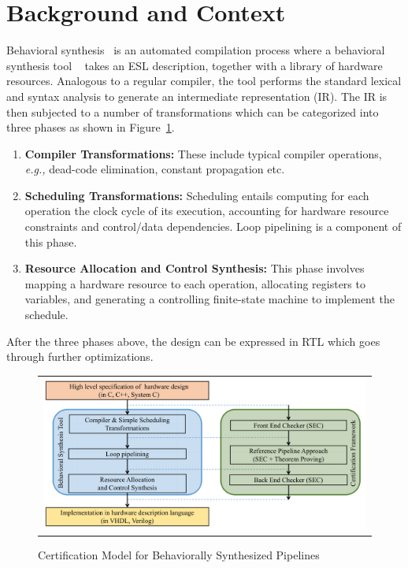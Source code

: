 \section{Background and Context}
\label{sec:background}

Behavioral synthesis~\cite{lin:survey-97} is an automated compilation process where a behavioral synthesis tool ~\cite{spark,xpilot,legup}  takes an ESL description, together with a library of hardware resources. Analogous to a regular compiler,
the tool performs the standard lexical and syntax analysis to generate an intermediate representation (IR). The IR is then subjected to a number of
transformations which can be categorized into three phases as shown in Figure~\ref{fig:certification-framework}.

 \begin{enumerate}
\item {\bf Compiler Transformations:} These include typical
  compiler operations, {\em e.g.,} dead-code elimination,
  constant propagation etc. 
\item {\bf Scheduling Transformations:} Scheduling entails
  computing for each operation the clock cycle of its
  execution, accounting for hardware resource constraints
  and control/data dependencies.  Loop pipelining is a component 
  of this phase.
\item {\bf Resource Allocation and Control Synthesis:} This phase
  involves mapping a hardware resource to each operation, allocating
  registers to variables, and generating a controlling finite-state
  machine to implement the schedule.
\end{enumerate}
After the three phases above, the design can be expressed in
RTL which goes through further optimizations. 

\begin{figure}[t!]
\begin{center}
\begin{tabular}{c}
\includegraphics[height=2in]{fig-proposal/certification-framework}
\end{tabular}
\end{center}
\caption{Certification Model for Behaviorally Synthesized Pipelines}
\label{fig:certification-framework}
\end{figure}

